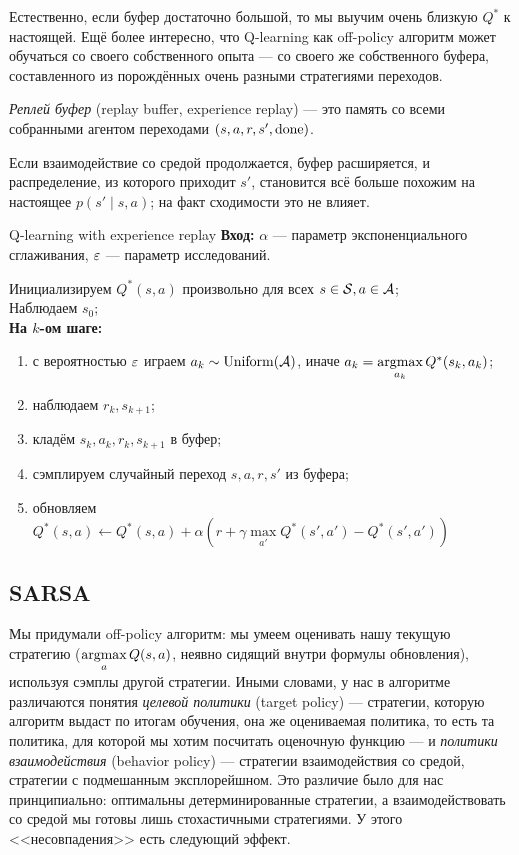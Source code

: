 Естественно, если буфер достаточно большой, то мы выучим очень близкую $Q^*$ к настоящей. Ещё более интересно, что Q-learning как off-policy алгоритм может обучаться со своего собственного опыта --- со своего же собственного буфера, составленного из порождённых очень разными стратегиями переходов. 

\begin{definition}
\emph{Реплей буфер} (replay buffer, experience replay) --- это память со всеми собранными агентом переходами $(s, a, r, s', \mathrm{done})$.
\end{definition}

Если взаимодействие со средой продолжается, буфер расширяется, и распределение, из которого приходит $s'$, становится всё больше похожим на настоящее $p(s' \mid s, a)$; на факт сходимости это не влияет.

\begin{algorithm}{Q-learning with experience replay}
\textbf{Вход:} $\alpha$ --- параметр экспоненциального сглаживания, $\varepsilon$ --- параметр исследований.

\vspace{0.3cm}
Инициализируем $Q^*(s, a)$ произвольно для всех $s \in \mathcal{S}, a \in \mathcal{A}$; \\
Наблюдаем $s_0$; \\ 
\textbf{На $k$-ом шаге:}
\begin{enumerate}
    \item с вероятностью $\varepsilon$ играем $a_k \sim \operatorname{Uniform}(\mathcal{A})$, иначе $a_k = \mathop{\mathrm{argmax}}\limits_{a_k} Q^*(s_k, a_k)$;
    \item наблюдаем $r_k, s_{k+1}$;
    \item кладём $s_k, a_k, r_k, s_{k+1}$ в буфер;
    \item сэмплируем случайный переход $s, a, r, s'$ из буфера;
    \item обновляем $Q^*(s, a) \leftarrow Q^*(s, a) + \alpha \left( r + \gamma \max\limits_{a'} Q^*(s', a') - Q^*(s', a') \right)$
\end{enumerate}
\end{algorithm}

\subsection{SARSA}

Мы придумали off-policy алгоритм: мы умеем оценивать нашу текущую стратегию ($\mathop{\mathrm{argmax}}\limits_a Q(s, a)$, неявно сидящий внутри формулы обновления), используя сэмплы другой стратегии. Иными словами, у нас в алгоритме различаются понятия \emph{целевой политики} (target policy) --- стратегии, которую алгоритм выдаст по итогам обучения, она же оцениваемая политика, то есть та политика, для которой мы хотим посчитать оценочную функцию --- и \emph{политики взаимодействия} (behavior policy) --- стратегии взаимодействия со средой, стратегии с подмешанным эксплорейшном. Это различие было для нас принципиально: оптимальны детерминированные стратегии, а взаимодействовать со средой мы готовы лишь стохастичными стратегиями. У этого <<несовпадения>> есть следующий эффект.

